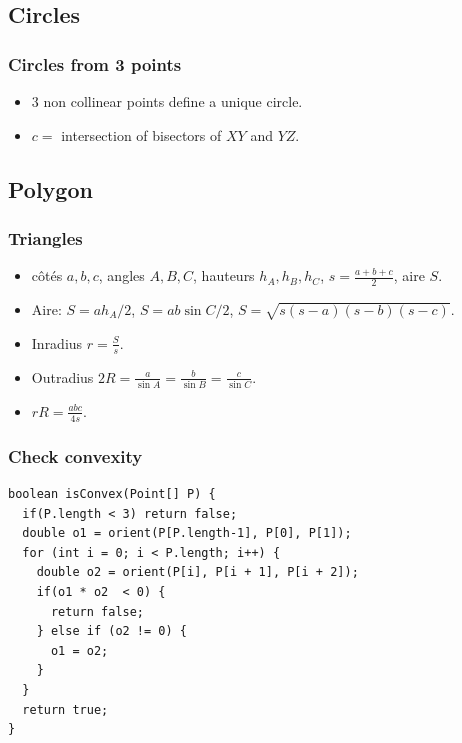 \subsection{Circles}
\subsubsection{Circles from 3 points}
\begin{itemize}
\item $3$ non collinear points define a unique circle.
\item $c = $ intersection of bisectors of $XY$ and $YZ$. 
\end{itemize}
\subsection{Polygon}
\subsubsection{Triangles}
\begin{itemize}
  \item côtés $a,b,c$, angles $A,B,C$, hauteurs $h_A,h_B,h_C$, $s=\frac{a+b+c}{2}$, aire $S$.
  \item Aire: $S=ah_A/2$, $S=ab\sin C/2$, $S=\sqrt{s(s-a)(s-b)(s-c)}$.
  \item Inradius $r=\frac{S}{s}$.
  \item Outradius $2R = \frac{a}{\sin A} = \frac{b}{\sin B} = \frac{c}{\sin C}$.
  \item $rR = \frac{abc}{4s}$.
\end{itemize}
\subsubsection{Check convexity}
\begin{lstlisting}
boolean isConvex(Point[] P) {
  if(P.length < 3) return false;
  double o1 = orient(P[P.length-1], P[0], P[1]);
  for (int i = 0; i < P.length; i++) {
    double o2 = orient(P[i], P[i + 1], P[i + 2]);
    if(o1 * o2  < 0) {
      return false;
    } else if (o2 != 0) {
      o1 = o2;
    }
  }
  return true;
}
\end{lstlisting}
